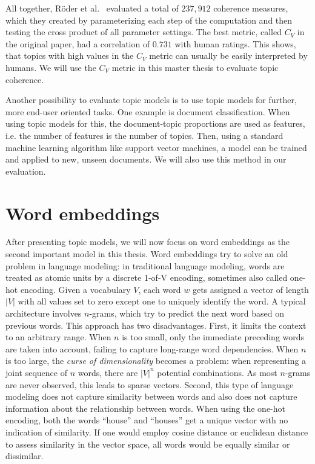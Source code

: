 \documentclass[
        a4paper,
        titlepage,
        twoside,
        parskip,
        numbers=noenddot
        ]{scrbook}
\theoremstyle{break}
\begin{document}
All together, Röder et al.~\cite{Roder2015} evaluated a total of $237,912$ coherence measures, which they created by parameterizing each step of the computation and then testing the cross product of all parameter settings.
The best metric, called $C_V$ in the original paper, had a correlation of $0.731$ with human ratings.
This shows, that topics with high values in the $C_V$ metric can usually be easily interpreted by humans.
We will use the $C_V$ metric in this master thesis to evaluate topic coherence.

Another possibility to evaluate topic models is to use topic models for further, more end-user oriented tasks.
One example is document classification.
When using topic models for this, the document-topic proportions are used as features, i.e. the number of features is the number of topics.
Then, using a standard machine learning algorithm like support vector machines, a model can be trained and applied to new, unseen documents.
We will also use this method in our evaluation.

\section{Word embeddings}

After presenting topic models, we will now focus on word embeddings as the second important model in this thesis.
Word embeddings try to solve an old problem in language modeling:
in traditional language modeling, words are treated as atomic units by a discrete 1-of-V encoding, sometimes also called one-hot encoding.
Given a vocabulary $V$, each word $w$ gets assigned a vector of length $|V|$ with all values set to zero except one to uniquely identify the word.
A typical architecture involves $n$-grams, which try to predict the next word based on previous words.
This approach has two disadvantages.
First, it limits the context to an arbitrary range.
When $n$ is too small, only the immediate preceding words are taken into account, failing to capture long-range word dependencies.
When $n$ is too large, the \emph{curse of dimensionality} becomes a problem: when representing a joint sequence of $n$ words, there are $|V|^n$ potential combinations.
As most $n$-grams are never observed, this leads to sparse vectors.
Second, this type of language modeling does not capture similarity between words and also does not capture information about the relationship between words.
When using the one-hot encoding, both the words ``house'' and ``houses'' get a unique vector with no indication of similarity.
If one would employ cosine distance or euclidean distance to assess similarity in the vector space, all words would be equally similar or dissimilar.
\end{document}
